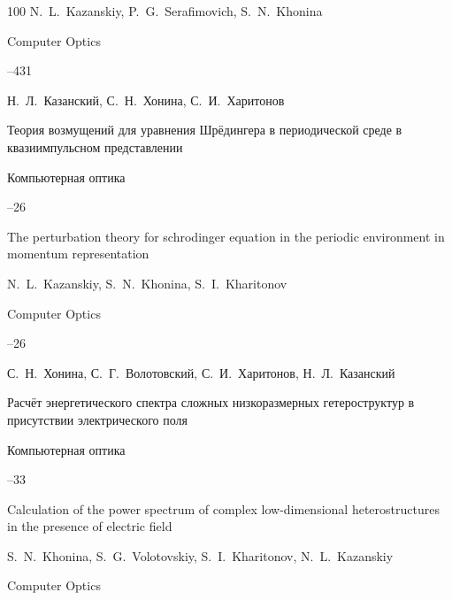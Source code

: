 \begin{thebibliography}{100}
\by N.~L.~Kazanskiy, P.~G.~Serafimovich, S.~N.~Khonina 

\jour Computer Optics




--431






\by Н.~Л.~Казанский, С.~Н.~Хонина, С.~И.~Харитонов

\paper Теория возмущений для уравнения Шрёдингера в периодической среде в квазиимпульсном представлении

\jour Компьютерная оптика




--26

\misctransl

\paper The perturbation theory for schrodinger equation in the periodic environment in momentum representation

\by N.~L.~Kazanskiy, S.~N.~Khonina, S.~I.~Kharitonov 

\jour Computer Optics




--26






\by С.~Н.~Хонина, С.~Г.~Волотовский, С.~И.~Харитонов, Н.~Л.~Казанский

\paper Расчёт энергетического спектра сложных низкоразмерных гетероструктур в присутствии электрического поля

\jour Компьютерная оптика




--33

\misctransl

\paper Calculation of the power spectrum of complex low-dimensional heterostructures in the presence of electric field

\by S.~N.~Khonina, S.~G.~Volotovskiy, S.~I.~Kharitonov, N.~L.~Kazanskiy

\jour Computer Optics


\end{thebibliography}
